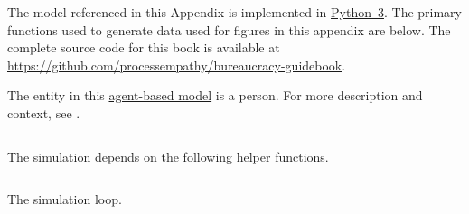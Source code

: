 

The model referenced in this Appendix is implemented in \href{https://en.wikipedia.org/wiki/Python_(programming_language)}{Python~3}. The primary functions used to generate data used for figures in this appendix are below. The complete source code for this book is available at \href{https://github.com/processempathy/bureaucracy-guidebook}{https://github.com/processempathy/bureaucracy-guidebook}.

The entity in this
\href{https://en.wikipedia.org/wiki/Agent-based_model}{agent-based model} is a person. For more description and context, see 
\iftoggle{haspagenumbers}{page~\pageref{sec:example-people}}{section~\ref{sec:example-people}}.
\inputminted[fontsize=\footnotesize,linenos]{python}{python3_lib_simulation__create_person.py}

The simulation depends on the following helper functions.
\begin{landscape}
\inputminted[fontsize=\footnotesize,linenos]{python}{python3_lib_simulation__helper_functions.py}
\end{landscape}

\begin{landscape}
The simulation loop.
\inputminted[fontsize=\footnotesize,linenos]{python}{python3_lib_simulation__simulate.py}
\end{landscape}
